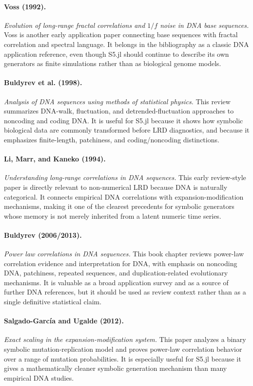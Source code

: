 \documentclass[11pt]{article}
\begin{document}
\paragraph{Voss (1992).}
\emph{Evolution of long-range fractal correlations and $1/f$ noise in DNA base
sequences.}
Voss is another early application paper connecting base sequences with fractal
correlation and spectral language. It belongs in the bibliography as a classic
DNA application reference, even though S5.jl should continue to describe its own
generators as finite simulations rather than as biological genome models.

\paragraph{Buldyrev et al. (1998).}
\emph{Analysis of DNA sequences using methods of statistical physics.}
This review summarizes DNA-walk, fluctuation, and detrended-fluctuation
approaches to noncoding and coding DNA. It is useful for S5.jl because it shows
how symbolic biological data are commonly transformed before LRD diagnostics,
and because it emphasizes finite-length, patchiness, and coding/noncoding
distinctions.

\paragraph{Li, Marr, and Kaneko (1994).}
\emph{Understanding long-range correlations in DNA sequences.}
This early review-style paper is directly relevant to non-numerical LRD because
DNA is naturally categorical. It connects empirical DNA correlations with
expansion-modification mechanisms, making it one of the clearest precedents for
symbolic generators whose memory is not merely inherited from a latent numeric
time series.

\paragraph{Buldyrev (2006/2013).}
\emph{Power law correlations in DNA sequences.}
This book chapter reviews power-law correlation evidence and interpretation for
DNA, with emphasis on noncoding DNA, patchiness, repeated sequences, and
duplication-related evolutionary mechanisms. It is valuable as a broad
application survey and as a source of further DNA references, but it should be
used as review context rather than as a single definitive statistical claim.

\paragraph{Salgado-García and Ugalde (2012).}
\emph{Exact scaling in the expansion-modification system.}
This paper analyzes a binary symbolic mutation-replication model and proves
power-law correlation behavior over a range of mutation probabilities. It is
especially useful for S5.jl because it gives a mathematically cleaner symbolic
generation mechanism than many empirical DNA studies.
\end{document}
